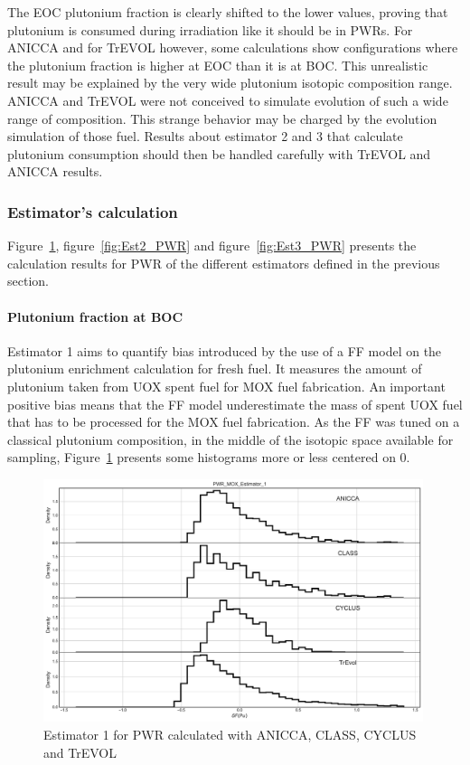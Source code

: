 The EOC plutonium fraction is clearly shifted to the lower values, proving that plutonium is consumed during irradiation like it should be in PWRs. For ANICCA and for TrEVOL however, some calculations show configurations where the plutonium fraction is higher at EOC than it is at BOC. This unrealistic result may be explained by the very wide plutonium isotopic composition range. ANICCA and TrEVOL were not conceived to simulate evolution of such a wide range of composition. This strange behavior may be charged by the evolution simulation of those fuel. Results about estimator 2 and 3 that calculate plutonium consumption should then be handled carefully with TrEVOL and ANICCA results.   

\subsubsection{Estimator's calculation}

Figure~\ref{fig:Est1_PWR}, figure~\ref{fig:Est2_PWR} and figure~\ref{fig:Est3_PWR} presents the calculation results for PWR of the different estimators defined in the previous section. 

\paragraph{Plutonium fraction at BOC}
Estimator 1 aims to quantify bias introduced by the use of a FF model on the plutonium enrichment calculation for fresh fuel. It measures the amount of plutonium taken from UOX spent fuel for MOX fuel fabrication. An important positive bias means that the FF model underestimate the mass of spent UOX fuel that has to be processed for the MOX fuel fabrication. As the FF was tuned on a classical plutonium composition, in the middle of the isotopic space available for sampling, Figure~\ref{fig:Est1_PWR} presents some histograms more or less centered on 0.
        

\begin{figure}[h]
	\begin{center}
		\includegraphics[width = 0.99\textwidth]{../../Feature_1/RAW_DATA/FIG/PWR_MOX_Estimator_1.pdf}
		\caption{Estimator 1 for PWR calculated with ANICCA, CLASS, CYCLUS and TrEVOL}
		\label{fig:Est1_PWR}
	\end{center}
\end{figure}

